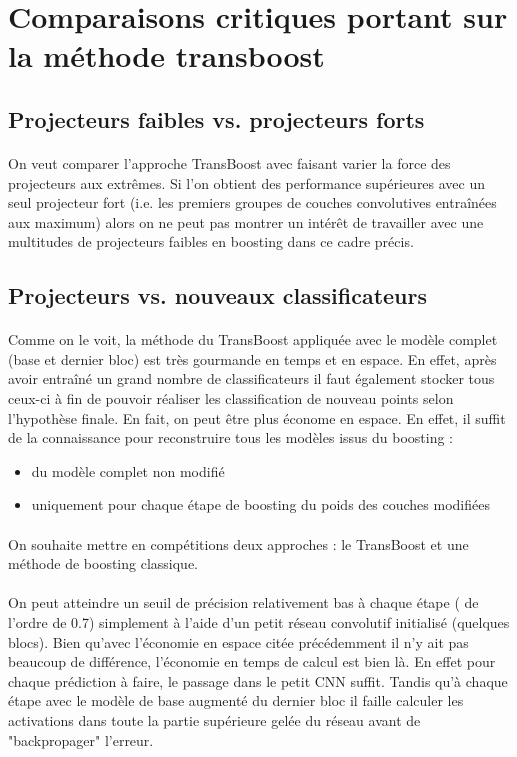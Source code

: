\documentclass[11 pt]{article}
\begin{document}
\section{Comparaisons critiques portant sur la méthode transboost}
\subsection{Projecteurs faibles vs. projecteurs forts}
\paragraph{}On veut comparer l’approche TransBoost avec faisant varier la force des projecteurs aux extrêmes. Si l’on obtient des performance supérieures avec un seul projecteur fort (i.e. les premiers groupes de couches convolutives entraînées aux maximum) alors on ne peut pas montrer un intérêt de travailler avec une multitudes de projecteurs faibles en boosting dans ce cadre précis.

\subsection{Projecteurs vs. nouveaux classificateurs}
\paragraph{}Comme on le voit, la méthode du TransBoost appliquée avec le modèle complet (base et dernier bloc) est très gourmande en temps et en espace. En effet, après avoir entraîné un grand nombre de classificateurs il faut également stocker tous ceux-ci à fin de pouvoir réaliser les classification de nouveau points selon l’hypothèse finale. En fait, on peut être plus économe en espace. En effet, il suffit de la connaissance pour reconstruire tous les modèles issus du boosting :\\ \medskip
\begin{itemize}
  \item du modèle complet non modifié
  \item uniquement pour chaque étape de boosting du poids des couches modifiées
\end{itemize}
\paragraph{}On souhaite mettre en compétitions deux approches : le TransBoost et une méthode de boosting classique.

\paragraph{}On peut atteindre un seuil de précision relativement bas à chaque étape ( de l’ordre de 0.7) simplement à l’aide d’un petit réseau convolutif initialisé (quelques blocs). Bien qu’avec l’économie en espace citée précédemment il n’y ait pas beaucoup de différence, l’économie en temps de calcul est bien là. En effet pour chaque prédiction à faire, le passage dans le petit CNN suffit. Tandis qu’à chaque étape avec le modèle de base augmenté du dernier bloc il faille calculer les activations dans toute la partie supérieure gelée du réseau avant de "backpropager" l’erreur.
\end{document}
